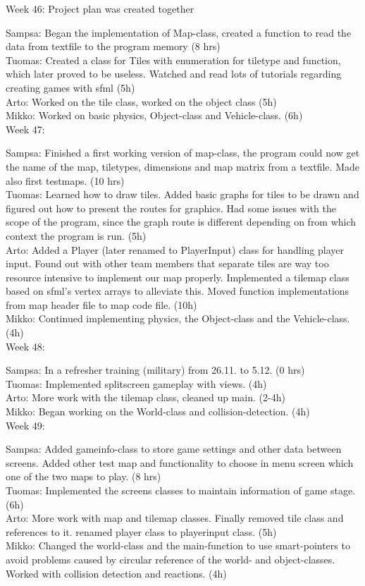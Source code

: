 \documentclass{article} %
\begin{document}
Week 46: Project plan was created together

Sampsa: Began the implementation of Map-class, created a function to read the data from textfile to the program memory (8 hrs)\\
Tuomas: Created a class for Tiles with enumeration for tiletype and function, which later proved to be useless. Watched and read lots of tutorials regarding creating games with sfml (5h)\\
Arto: Worked on the tile class, worked on the object class (5h)\\
Mikko: Worked on basic physics, Object-class and Vehicle-class. (6h)\\

Week 47: 

Sampsa: Finished a first working version of map-class, the program could now get the name of the map, tiletypes, dimensions and map matrix from a textfile. Made also first testmaps. (10 hrs)\\
Tuomas: Learned how to draw tiles. Added basic graphs for tiles to be drawn and figured out how to present the routes for graphics. Had some issues with the scope of the program, since the graph route is different depending on from which context the program is run. (5h)\\
Arto: Added a Player (later renamed to PlayerInput) class for handling player input. Found out with other team members that separate tiles are way too resource intensive to implement our map properly. Implemented a tilemap class based on sfml’s vertex arrays to alleviate this. Moved function implementations from map header file to map code file. (10h)\\
Mikko: Continued implementing physics, the Object-class and the Vehicle-class. (4h)\\

Week 48:

Sampsa: In a refresher training (military) from 26.11. to 5.12. (0 hrs)\\
Tuomas: Implemented splitscreen gameplay with views. (4h)\\
Arto: More work with the tilemap class, cleaned up main. (2-4h)\\
Mikko: Began working on the World-class and collision-detection. (4h)\\ 

Week 49:

Sampsa: Added gameinfo-class to store game settings and other data between screens. Added other test map and functionality to choose in menu screen which one of the two maps to play. (8 hrs)\\
Tuomas: Implemented the screens classes to maintain information of game stage. (6h)\\
Arto: More work with map and tilemap classes. Finally removed tile class and references to it. renamed player class to playerinput class. (5h)\\
Mikko: Changed the world-class and the main-function to use smart-pointers to avoid problems caused by circular reference of the world- and object-classes. Worked with collision detection and reactions.  (4h)\\
\end{document}

